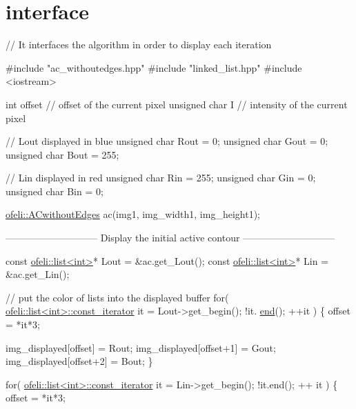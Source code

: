 \hypertarget{interface-example}{\section{interface}
}

\begin{DoxyCode}
\textcolor{comment}{// It interfaces the algorithm in order to display each iteration}

\textcolor{preprocessor}{#include "ac\_withoutedges.hpp"}
\textcolor{preprocessor}{#include "linked\_list.hpp"}
\textcolor{preprocessor}{#include <iostream>}

\textcolor{keywordtype}{int} offset \textcolor{comment}{// offset of the current pixel}
\textcolor{keywordtype}{unsigned} \textcolor{keywordtype}{char} I \textcolor{comment}{// intensity of the current pixel}

\textcolor{comment}{// Lout displayed in blue}
\textcolor{keywordtype}{unsigned} \textcolor{keywordtype}{char} Rout = 0;
\textcolor{keywordtype}{unsigned} \textcolor{keywordtype}{char} Gout = 0;
\textcolor{keywordtype}{unsigned} \textcolor{keywordtype}{char} Bout = 255;

\textcolor{comment}{// Lin displayed in red}
\textcolor{keywordtype}{unsigned} \textcolor{keywordtype}{char} Rin = 255;
\textcolor{keywordtype}{unsigned} \textcolor{keywordtype}{char} Gin = 0;
\textcolor{keywordtype}{unsigned} \textcolor{keywordtype}{char} Bin = 0;


\hyperlink{classofeli_1_1_a_cwithout_edges}{ofeli::ACwithoutEdges} ac(img1, img\_width1, img\_height1);


-----------------------------   Display the initial active contour   -----------------------------

\textcolor{keyword}{const} \hyperlink{classofeli_1_1list}{ofeli::list<int>}* Lout = &ac.get\_Lout();
\textcolor{keyword}{const} \hyperlink{classofeli_1_1list}{ofeli::list<int>}* Lin = &ac.get\_Lin();

\textcolor{comment}{// put the color of lists into the displayed buffer}
\textcolor{keywordflow}{for}( \hyperlink{classofeli_1_1list_1_1const__iterator}{ofeli::list<int>::const\_iterator} it = Lout->get\_begin(); !it.
      \hyperlink{classofeli_1_1list_1_1const__iterator_aa79779e28253e61c8d1816f577de4ffd}{end}(); ++it )
\{
    offset = *it*3;

    img\_displayed[offset] = Rout;
    img\_displayed[offset+1] = Gout;
    img\_displayed[offset+2] = Bout;
\}

\textcolor{keywordflow}{for}( \hyperlink{classofeli_1_1list_1_1const__iterator}{ofeli::list<int>::const\_iterator} it = Lin->get\_begin(); !it.end(); ++
      it )
\{
    offset = *it*3;


\end{DoxyCode}
